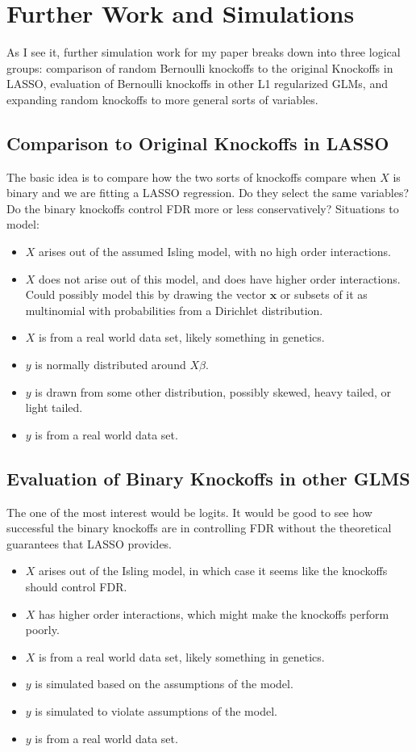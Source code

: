 \documentclass[11pt]{article}
\theoremstyle{definition}
\begin{document}
\section{Further Work and Simulations}
As I see it, further simulation work for my paper breaks down into three logical groups: comparison of random Bernoulli knockoffs to the original Knockoffs in LASSO, evaluation of Bernoulli knockoffs in other L1 regularized GLMs, and expanding random knockoffs to more general sorts of variables.

\subsection{Comparison to Original Knockoffs in LASSO}
The basic idea is to compare how the two sorts of knockoffs compare when $X$ is binary and we are fitting a LASSO regression. Do they select the same variables? Do the binary knockoffs control FDR more or less conservatively? Situations to model:
\begin{itemize}
    \item $X$ arises out of the assumed Isling model, with no high order interactions. 
    \item $X$ does not arise out of this model, and does have higher order interactions. Could possibly model this by drawing the vector $\mathbf x$ or subsets of it as multinomial with probabilities from a Dirichlet distribution.
    \item $X$ is from a real world data set, likely something in genetics.
    \item $y$ is normally distributed around $X\beta$.
    \item $y$ is drawn from some other distribution, possibly skewed, heavy tailed, or light tailed.
    \item $y$ is from a real world data set.
\end{itemize}

\subsection{Evaluation of Binary Knockoffs in other GLMS}
The one of the most interest would be logits. It would be good to see how successful the binary knockoffs are in controlling FDR without the theoretical guarantees that LASSO provides.
\begin{itemize}
    \item $X$ arises out of the Isling model, in which case it seems like the knockoffs should control FDR.
    \item $X$ has higher order interactions, which might make the knockoffs perform poorly.
    \item $X$ is from a real world data set, likely something in genetics.
    \item $y$ is simulated based on the assumptions of the model.
    \item $y$ is simulated to violate assumptions of the model.
    \item $y$ is from a real world data set.
\end{itemize}
\end{document}
